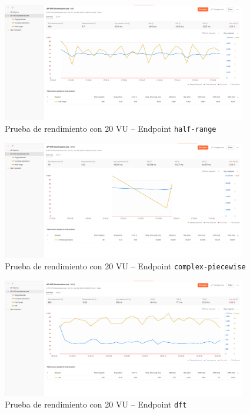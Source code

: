 \begin{figure}[H]
	\centering
	\includegraphics[width=0.95\textwidth]{img/chapter07/test-20users-half.png}
	\caption{Prueba de rendimiento con 20 VU – Endpoint \texttt{half-range}}
	\label{fig:test-20users-half}
\end{figure}

\begin{figure}[H]
	\centering
	\includegraphics[width=0.95\textwidth]{img/chapter07/test-20users-complex.png}
	\caption{Prueba de rendimiento con 20 VU – Endpoint \texttt{complex-piecewise}}
	\label{fig:test-20users-complex}
\end{figure}

\begin{figure}[H]
	\centering
	\includegraphics[width=0.95\textwidth]{img/chapter07/test-20users-dft.png}
	\caption{Prueba de rendimiento con 20 VU – Endpoint \texttt{dft}}
	\label{fig:test-20users-dft}
\end{figure}

